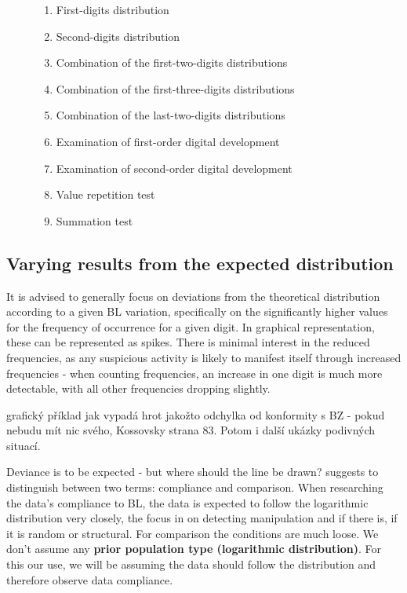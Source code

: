 \begin{figure}[h]
    \centering
    \label{fig:enter-label}
\begin{enumerate}
    \item First-digits distribution
    \item Second-digits distribution
    \item Combination of the first-two-digits distributions
    \item Combination of the first-three-digits distributions
    \item Combination of the last-two-digits distributions 
    \item Examination of first-order digital development
    \item Examination of second-order digital development
    \item Value repetition test
    \item Summation test   
\end{enumerate}
\end{figure}

\subsection{Varying results from the expected distribution}

It is advised to generally focus on deviations from the theoretical distribution according to a given BL variation, specifically on the significantly higher values for the frequency of occurrence for a given digit. In graphical representation, these can be represented as spikes. There is minimal interest in the reduced frequencies, as any suspicious activity is likely to manifest itself through increased frequencies - when counting frequencies, an increase in one digit is much more detectable, with all other frequencies dropping slightly. \cite{kossovsky2014benford} %

\begin{koment}
    grafický příklad jak vypadá hrot jakožto odchylka od konformity s BZ - pokud nebudu mít nic svého, Kossovsky strana 83. Potom i další ukázky podivných situací.
\end{koment}

Deviance is to be expected - but where should the line be drawn?  \citeauthor{kossovsky2014benford} suggests to distinguish between two terms: compliance and comparison. When researching the data's compliance to BL, the data is expected to follow the logarithmic distribution very closely, the focus in on detecting manipulation and if there is, if it is random or structural. For comparison the conditions are much loose. We don't assume any \textbf{prior population type (logarithmic distribution)}. For this our use, we will be assuming the data should follow the distribution and therefore observe data compliance.



